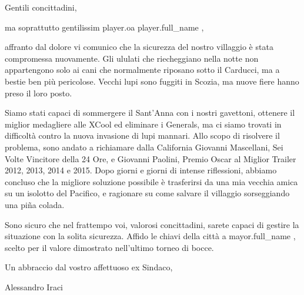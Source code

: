 \documentclass{letter}
\date{17 novembre 2015}
\begin{document}
\begin{letter}{}
\opening{Gentili concittadini,}

ma soprattutto gentilissim{{ player.oa }} {{ player.full_name }},

affranto dal dolore vi comunico che la sicurezza del nostro villaggio è stata compromessa nuovamente. Gli ululati che riecheggiano nella notte non appartengono solo ai cani che normalmente riposano sotto il Carducci, ma a bestie ben più pericolose. Vecchi lupi sono fuggiti in Scozia, ma nuove fiere hanno preso il loro posto.

Siamo stati capaci di sommergere il Sant'Anna con i nostri gavettoni, ottenere il miglior medagliere alle XCool ed eliminare i Generals, ma ci siamo trovati in difficoltà contro la nuova invasione di lupi mannari. Allo scopo di risolvere il problema, sono andato a richiamare dalla California Giovanni Mascellani, Sei Volte Vincitore della 24 Ore, e Giovanni Paolini, Premio Oscar al Miglior Trailer 2012, 2013, 2014 e 2015. Dopo giorni e giorni di intense riflessioni, abbiamo concluso che la migliore soluzione possibile è trasferirsi da una mia vecchia amica su un isolotto del Pacifico, e ragionare su come salvare il villaggio sorseggiando una pi\~na colada.

Sono sicuro che nel frattempo voi, valorosi concittadini, sarete capaci di gestire la situazione con la solita sicurezza. Affido le chiavi della città a {{ mayor.full_name }}, scelto per il valore dimostrato nell'ultimo torneo di bocce.

Un abbraccio dal vostro affettuoso ex Sindaco,

\bigskip

\noindent Alessandro Iraci

\end{letter}
\end{document}
